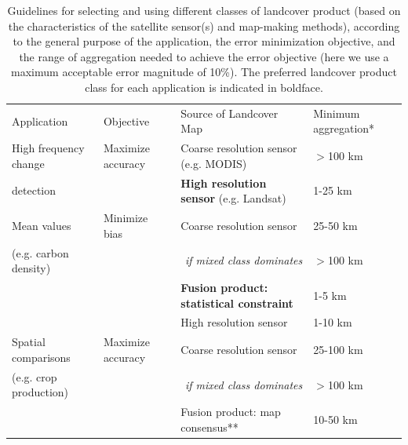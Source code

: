 \documentclass{pnastwo}
\begin{document}
\begin{article}
\begin{table}[!h]
  \begin{threeparttable}
    \caption{Guidelines for selecting and using different classes of landcover product (based on the characteristics of the satellite sensor(s) and map-making methods), according to the general purpose of the application, the error minimization objective, and the range of aggregation needed to achieve the error objective (here we use a maximum acceptable error magnitude of 10\%). The preferred landcover product class for each application is indicated in boldface. }
    \begin{center}
      \begin{tabular}{p{4.5cm}lp{6cm}l}
       \hline
Application                     & Objective & Source of Landcover Map & Minimum aggregation* \\
\Xhline{1pt}
High frequency change           & Maximize accuracy   & Coarse resolution sensor (e.g. MODIS) & $>$100 km\\
detection                                                               &                                  & \textbf{High resolution sensor} (e.g. Landsat)   &  1-25 km\\
\hline
Mean values         & Minimize bias            & Coarse resolution sensor  & 25-50 km \\
(e.g. carbon density)                                                              &                                   &  \multicolumn{1}{r}{\emph{if mixed class dominates}}                                    & $>$100 km \\
                                                              &                                   & \textbf{Fusion product: statistical constraint} & 1-5 km\\
                                                              &                                   & High resolution sensor & 1-10 km\\
\hline
Spatial comparisons & Maximize accuracy  & Coarse resolution sensor & 25-100 km\\
 (e.g. crop production)                                                               &                                   &  \multicolumn{1}{r}{\emph{if mixed class dominates}}                                    & $>$100 km \\
                                                             &                                   & Fusion product: map consensus** & 10-50 km\\

\end{tabular}
\end{center}
\end{threeparttable}
\end{table}
\end{article}
\end{document}

